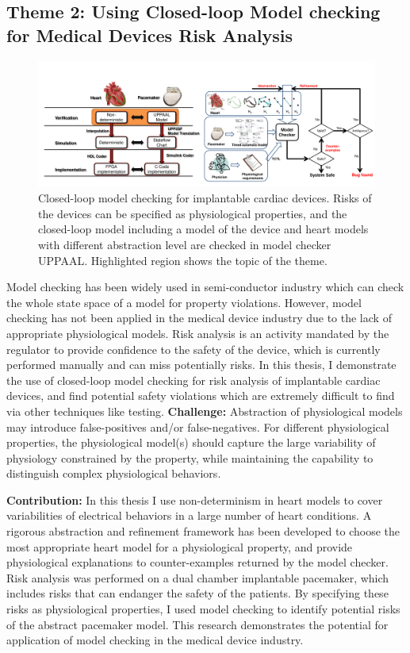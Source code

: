 \documentclass[a4paper,11pt]{article}
\begin{document}
\subsection{Theme 2: Using Closed-loop Model checking for Medical Devices Risk Analysis}
\begin{figure}[t]
	\centering
	\includegraphics[scale=0.32]{figs/mb_mc.pdf}
	\caption{\small Closed-loop model checking for implantable cardiac devices. Risks of the devices can be specified as physiological properties, and the closed-loop model including a model of the device and heart models with different abstraction level are checked in model checker UPPAAL. Highlighted region shows the topic of the theme.}
	\label{fig:mb_mc}
\end{figure}
Model checking has been widely used in semi-conductor industry which can check the whole state space of a model for property violations.
However, model checking has not been applied in the medical device industry due to the lack of appropriate physiological models.
Risk analysis is an activity mandated by the regulator to provide confidence to the safety of the device, which is currently performed manually and can miss potentially risks.
In this thesis, I demonstrate the use of closed-loop model checking for risk analysis of implantable cardiac devices, and find potential safety violations which are extremely difficult to find via other techniques like testing.
\noindent\textbf{Challenge:} Abstraction of physiological models may introduce false-positives and/or false-negatives. For different physiological properties, the physiological model(s) should capture the large variability of physiology constrained by the property, while maintaining the capability to distinguish complex physiological behaviors.

\noindent\textbf{Contribution:}
In this thesis I use non-determinism in heart models to cover variabilities of electrical behaviors in a large number of heart conditions.
A rigorous abstraction and refinement framework has been developed to choose the most appropriate heart model for a physiological property, and provide physiological explanations to counter-examples returned by the model checker.
Risk analysis was performed on a dual chamber implantable pacemaker, which includes risks that can endanger the safety of the patients.
By specifying these risks as physiological properties, I used model checking to identify potential risks of the abstract pacemaker model.
This research demonstrates the potential for application of model checking in the medical device industry.
\end{document}

